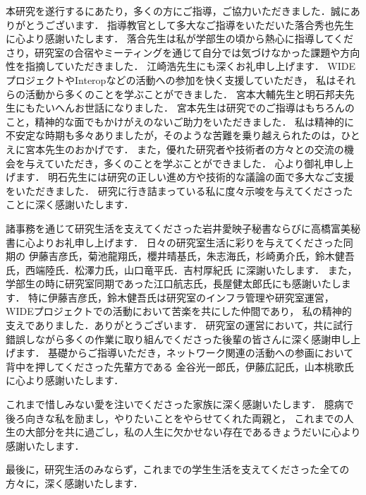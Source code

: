 本研究を遂行するにあたり，多くの方にご指導，ご協力いただきました．誠にありがとうございます．
指導教官として多大なご指導をいただいた落合秀也先生に心より感謝いたします．
落合先生は私が学部生の頃から熱心に指導してくださり，研究室の合宿やミーティングを通じて自分では気づけなかった課題や方向性を指摘していただきました．
江崎浩先生にも深くお礼申し上げます．
WIDEプロジェクトやInteropなどの活動への参加を快く支援していただき，
私はそれらの活動から多くのことを学ぶことができました．
宮本大輔先生と明石邦夫先生にもたいへんお世話になりました．
宮本先生は研究でのご指導はもちろんのこと，精神的な面でもかけがえのないご助力をいただきました．
私は精神的に不安定な時期も多々ありましたが，そのような苦難を乗り越えられたのは，ひとえに宮本先生のおかげです．
また，優れた研究者や技術者の方々との交流の機会を与えていただき，多くのことを学ぶことができました．
心より御礼申し上げます．
明石先生には研究の正しい進め方や技術的な議論の面で多大なご支援をいただきました．
研究に行き詰まっている私に度々示唆を与えてくださったことに深く感謝いたします．

諸事務を通じて研究生活を支えてくださった岩井愛映子秘書ならびに高橋富美秘書に心よりお礼申し上げます．
日々の研究室生活に彩りを与えてくださった同期の
伊藤吉彦氏，菊池龍翔氏，櫻井晴基氏，朱志海氏，杉崎勇介氏，鈴木健吾氏，西端陸氏．松澤力氏，山口竜平氏．吉村厚紀氏
に深謝いたします．
また，学部生の時に研究室同期であった江口航志氏，長屋健太郎氏にも感謝いたします．
特に伊藤吉彦氏，鈴木健吾氏は研究室のインフラ管理や研究室運営，WIDEプロジェクトでの活動において苦楽を共にした仲間であり，
私の精神的支えでありました．ありがとうございます．
研究室の運営において，共に試行錯誤しながら多くの作業に取り組んでくださった後輩の皆さんに深く感謝申し上げます．
基礎からご指導いただき，ネットワーク関連の活動への参画において
背中を押してくださった先輩方である
金谷光一郎氏，伊藤広記氏，山本桃歌氏に心より感謝いたします．

これまで惜しみない愛を注いでくださった家族に深く感謝いたします．
臆病で後ろ向きな私を励まし，やりたいことをやらせてくれた両親と，
これまでの人生の大部分を共に過ごし，私の人生に欠かせない存在であるきょうだいに心より感謝いたします．

最後に，研究生活のみならず，これまでの学生生活を支えてくださった全ての方々に，深く感謝いたします．
